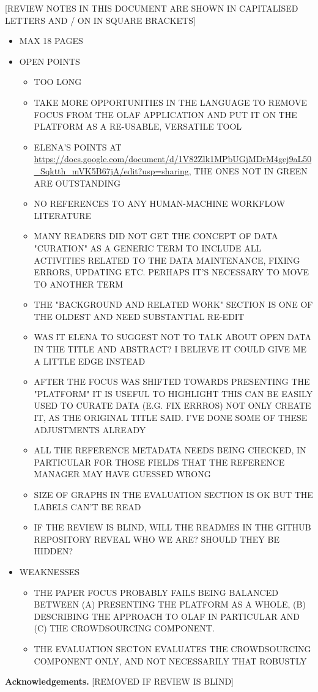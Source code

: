\documentclass{llncs}
\begin{document}
[REVIEW NOTES IN THIS DOCUMENT ARE SHOWN IN CAPITALISED LETTERS AND / ON IN SQUARE BRACKETS] 
\begin{itemize}

    \item MAX 18 PAGES
    \item OPEN POINTS
        \begin{itemize}
            \item TOO LONG
            \item TAKE MORE OPPORTUNITIES IN THE LANGUAGE TO REMOVE FOCUS FROM THE OLAF APPLICATION AND PUT IT ON THE PLATFORM AS A RE-USABLE, VERSATILE TOOL
            \item ELENA'S POINTS AT \url{https://docs.google.com/document/d/1V82Zlk1MPbUGjMDrM4gej9aL50_Sqktth_mVK5B67jA/edit?usp=sharing}, THE ONES NOT IN GREEN ARE OUTSTANDING
            \item NO REFERENCES TO ANY HUMAN-MACHINE WORKFLOW LITERATURE
            \item MANY READERS DID NOT GET THE CONCEPT OF DATA "CURATION" AS A GENERIC TERM TO INCLUDE ALL ACTIVITIES RELATED TO THE DATA MAINTENANCE, FIXING ERRORS, UPDATING ETC.  PERHAPS IT'S NECESSARY TO MOVE TO ANOTHER TERM
            \item THE "BACKGROUND AND RELATED WORK" SECTION IS ONE OF THE OLDEST AND NEED SUBSTANTIAL RE-EDIT
            \item WAS IT ELENA TO SUGGEST NOT TO TALK ABOUT OPEN DATA IN THE TITLE AND ABSTRACT? I BELIEVE IT COULD GIVE ME A LITTLE EDGE INSTEAD
            \item AFTER THE FOCUS WAS SHIFTED TOWARDS PRESENTING THE "PLATFORM" IT IS USEFUL TO HIGHLIGHT THIS CAN BE EASILY USED TO CURATE DATA (E.G. FIX ERRROS) NOT ONLY CREATE IT, AS THE ORIGINAL TITLE SAID. I'VE DONE SOME OF THESE ADJUSTMENTS ALREADY
            \item ALL THE REFERENCE METADATA NEEDS BEING CHECKED, IN PARTICULAR FOR THOSE FIELDS THAT THE REFERENCE MANAGER MAY HAVE GUESSED WRONG
            \item SIZE OF GRAPHS IN THE EVALUATION SECTION IS OK BUT THE LABELS CAN'T BE READ
            \item IF THE REVIEW IS BLIND, WILL THE READMES IN THE GITHUB REPOSITORY REVEAL WHO WE ARE? SHOULD THEY BE HIDDEN?
        \end{itemize}
    \item WEAKNESSES 
        \begin{itemize}
            \item THE PAPER FOCUS PROBABLY FAILS BEING BALANCED BETWEEN (A) PRESENTING THE PLATFORM AS A WHOLE, (B) DESCRIBING THE APPROACH TO OLAF IN PARTICULAR AND (C) THE CROWDSOURCING COMPONENT.  
            \item THE EVALUATION SECTON EVALUATES THE CROWDSOURCING COMPONENT ONLY, AND NOT NECESSARILY THAT ROBUSTLY
        \end{itemize}
\end{itemize}









\textbf{Acknowledgements.} [REMOVED IF REVIEW IS BLIND]


\end{document}
